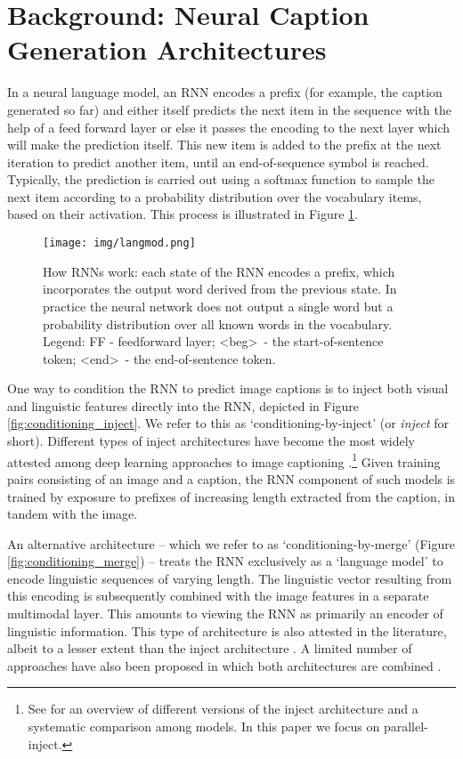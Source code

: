 \documentclass[11pt,letterpaper]{article}
\begin{document}
\section{Background: Neural Caption Generation Architectures}\label{sec:background}

In a neural language model, an RNN encodes a prefix (for example, the caption generated so far) and either itself predicts the next item in the sequence with the help of a feed forward layer or else it passes the encoding to the next layer which will make the prediction itself. This new item is added to the prefix at the next iteration to predict another item, until an end-of-sequence symbol is reached. Typically, the prediction is carried out using a softmax function to sample the next item according to a probability distribution over the vocabulary items, based on their activation. This process is illustrated in Figure \ref{fig:rnn-cont}.

\begin{figure}[t]
	\centering
	  \texttt{[image: img/langmod.png]}	
      \caption{
          \label{fig:rnn-cont}
          How RNNs work: each state of the RNN encodes a prefix, which incorporates the output word derived from the previous state. In practice the neural network does not output a single word but a probability distribution over all known words in the vocabulary. Legend: FF - feedforward layer; \textless beg\textgreater\ - the start-of-sentence token; \textless end\textgreater\ - the end-of-sentence token. 
      }
\end{figure}

One way to condition the RNN to predict image captions is to inject both visual and linguistic features directly into the RNN, depicted in Figure \ref{fig:conditioning_inject}. We refer to this as `conditioning-by-inject' (or {\em inject} for short). Different types of inject architectures have become the most widely attested among deep learning approaches to image captioning \cite{Chen2015,Donahue2015,Hessel2015,Karpathy2015,Liu2016,Yang2016,Zhou2016}.\footnote{See  for an overview of different versions of the inject architecture and a systematic comparison among models. In this paper we focus on parallel-inject.} Given training pairs consisting of an image and a caption, the RNN component of such models is trained by exposure to prefixes of increasing length extracted from the caption, in tandem with the image.

An alternative architecture -- which we refer to as `conditioning-by-merge' (Figure \ref{fig:conditioning_merge}) -- treats the RNN exclusively as a `language model' to encode linguistic sequences of varying length. The linguistic vector resulting from this encoding is subsequently combined with the image features in a separate multimodal layer. This amounts to viewing the RNN as primarily an encoder of linguistic information.
This type of architecture is also attested in the literature, albeit to a lesser extent than the inject architecture 
\cite{Mao2014,Mao2015,Mao2015a,Song2016,Hendricks2016,You2016}. 
A limited number of approaches have also been proposed in which both architectures are combined \cite{Lu2016,Xu2015}.
\end{document}
